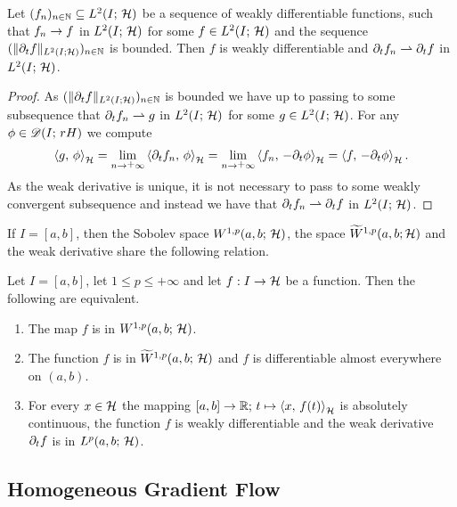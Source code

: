\begin{lemma}\label{lemma:bnd wk der and str conv fun imply wk conv of wk der}
	Let $ (f_n)_{n\in\mathbb{N}}\subseteq L^2(I;\,\mathcal{H}) $ 
	be a sequence of weakly differentiable functions,
	such that $ f_n\rightarrow f $ in $ L^2(I;\,\mathcal{H}) $
	for some $ f\in L^2(I;\,\mathcal{H}) $ and the
	sequence $ (\Vert \partial_t f\Vert_{L^2(I;\mathcal{H})})_{n\in\mathbb{N}} $
	is bounded. Then $ f $ is weakly
	differentiable and $ \partial_t f_n\rightharpoonup \partial_t f $
	in $ L^2(I;\,\mathcal{H}) $.
\end{lemma}
\begin{proof}
	As $ (\Vert \partial_t f\Vert_{L^2(I;\mathcal{H})})_{n\in\mathbb{N}} $
	is bounded we have up to passing to some
	subsequence that
	$ \partial_t f_n\rightharpoonup g $ in $ L^2(I;\,\mathcal{H}) $
	for some $ g\in L^2(I;\,\mathcal{H}) $.
	For any $ \phi\in\mathscr{D}(I;\,rH) $ we compute
	\begin{align*}
		\inner{g}{\phi}
		=\lim_{n\ra\plus\infty}\inner{\prt_t f_n}{\phi}
		=\lim_{n\ra\plus\infty}\inner{f_n}{-\prt_t \phi}
		=\inner{f}{-\prt_t \phi}.
	\end{align*}
	As the weak derivative is unique, it is not necessary
	to pass to some weakly convergent subsequence and instead
	we have that $ \partial_t f_n\rightharpoonup \partial_t f $ in $ L^2(I;\,\mathcal{H}) $.
\end{proof}

If $ I=[a,b] $, then the Sobolev space 
$ W^{1,p}(a,b;\,\mathcal{H}) $, the space
$ \widetilde W^{1,p}(a,b;\mathcal{H}) $ and the
weak derivative share the following
relation.

\begin{proposition}\label{proposition:rel betw sob abs cont weak der}
	Let $ I=[a,b] $, let $ 1\leq p\leq\plus\infty $
	and let $ f:I\rightarrow\mathcal{H} $ be a function. Then
	the following are equivalent.
	\begin{enumerate}[label=(\roman*)]
		\item The map $ f $ is in $ W^{1,p}(a,b;\,\mathcal{H}) $.
		\item The function $ f $ is in $ \widetilde W^{1,p}(a,b;\,\mathcal{H}) $
		and $ f $ is differentiable almost everywhere on $ (a,b) $.
		\item For every $ x\in\mathcal{H} $ the mapping 
		$ [a,b]\rightarrow\mathbb{R};\,t\mapsto\left\langle x,\,f(t)\right\rangle_{\mathcal{H}} $ is 
		absolutely continuous, the function $ f $
		is weakly differentiable and the weak derivative
		$ \partial_t f $ is in $ L^p(a,b;\,\mathcal{H}) $.
	\end{enumerate}
\end{proposition}

\subsection{Homogeneous Gradient Flow}

